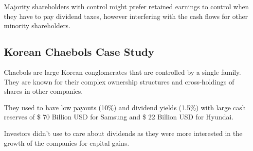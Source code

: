 Majority shareholders with control might prefer retained earnings to control when they have to pay dividend taxes, however interfering with the cash flows for other minority shareholders.

\subsection{Korean Chaebols Case Study}
Chaebols are large Korean conglomerates that are controlled by a single family. They are known for their complex ownership structures and cross-holdings of shares in other companies.

They used to have low payouts (10\%) and dividend yields (1.5\%) with large cash reserves of \$ 70 Billion USD for Samsung and \$ 22 Billion USD for Hyundai.

Investors didn't use to care about dividends as they were more interested in the growth of the companies for capital gains.


